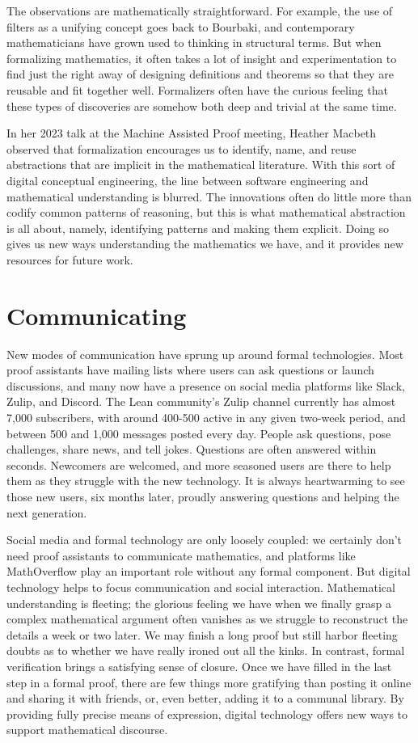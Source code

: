 \documentclass[12pt]{amsart}
\theoremstyle{definition}
\theoremstyle{remark}
\numberwithin{equation}{section}
\begin{document}
The observations are mathematically straightforward. For example, the use of filters as a unifying concept goes back to Bourbaki, and contemporary mathematicians have grown used to thinking in structural terms. But when formalizing mathematics, it often takes a lot of insight and experimentation to find just the right away of designing definitions and theorems so that they are reusable and fit together well. Formalizers often have the curious feeling that these types of discoveries are somehow both deep and trivial at the same time.

In her 2023 talk at the Machine Assisted Proof meeting, Heather Macbeth observed that formalization encourages us to identify, name, and reuse abstractions that are implicit in the mathematical literature. With this sort of digital conceptual engineering, the line between software engineering and mathematical understanding is blurred. The innovations often do little more than codify common patterns of reasoning, but this is what mathematical abstraction is all about, namely, identifying patterns and making them explicit. Doing so gives us new ways understanding the mathematics we have, and it provides new resources for future work.


\section{Communicating}
\label{section:communication}

New modes of communication have sprung up around formal technologies. Most proof assistants have mailing lists where users can ask questions or launch discussions, and many now have a presence on social media platforms like Slack, Zulip, and Discord. The Lean community's Zulip channel currently has almost 7,000 subscribers, with around 400-500 active in any given two-week period, and between 500 and 1,000 messages posted every day. People ask questions, pose challenges, share news, and tell jokes. Questions are often answered within seconds. Newcomers are welcomed, and more seasoned users are there to help them as they struggle with the new technology. It is always heartwarming to see those new users, six months later, proudly answering questions and helping the next generation.

Social media and formal technology are only loosely coupled: we certainly don't need proof assistants to communicate mathematics, and platforms like MathOverflow play an important role without any formal component. But digital technology helps to focus communication and social interaction. Mathematical understanding is fleeting; the glorious feeling we have when we finally grasp a complex mathematical argument often vanishes as we struggle to reconstruct the details a week or two later. We may finish a long proof but still harbor fleeting doubts as to whether we have really ironed out all the kinks. In contrast, formal verification brings a satisfying sense of closure. Once we have filled in the last step in a formal proof, there are few things more gratifying than posting it online and sharing it with friends, or, even better, adding it to a communal library. By providing fully precise means of expression, digital technology offers new ways to support mathematical discourse.
\end{document}

